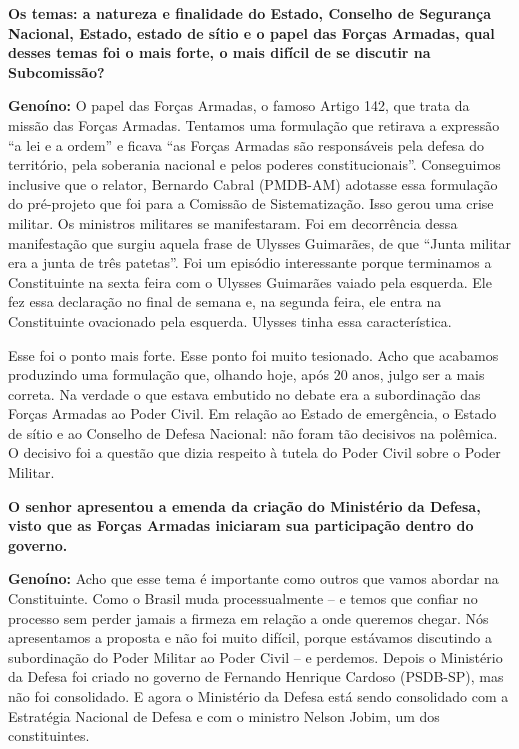 \textbf{Os temas: a natureza e finalidade do Estado, Conselho de
Segurança Nacional, Estado, estado de sítio e o papel das Forças
Armadas, qual desses temas foi o mais forte, o mais difícil de se
discutir na Subcomissão?}

\textbf{Genoíno:} O papel das Forças Armadas, o famoso Artigo 142, que
trata da missão das Forças Armadas. Tentamos uma formulação que retirava
a expressão ``a lei e a ordem'' e ficava ``as Forças Armadas são
responsáveis pela defesa do território, pela soberania nacional e pelos
poderes constitucionais''. Conseguimos inclusive que o relator, Bernardo
Cabral (PMDB-AM) adotasse essa formulação do pré-projeto que foi para a
Comissão de Sistematização. Isso gerou uma crise militar. Os ministros
militares se manifestaram. Foi em decorrência dessa manifestação que
surgiu aquela frase de Ulysses Guimarães, de que ``Junta militar era a
junta de três patetas''. Foi um episódio interessante porque terminamos
a Constituinte na sexta feira com o Ulysses Guimarães vaiado pela
esquerda. Ele fez essa declaração no final de semana e, na segunda
feira, ele entra na Constituinte ovacionado pela esquerda. Ulysses tinha
essa característica.

Esse foi o ponto mais forte. Esse ponto foi muito tesionado. Acho que
acabamos produzindo uma formulação que, olhando hoje, após 20 anos,
julgo ser a mais correta. Na verdade o que estava embutido no debate era
a subordinação das Forças Armadas ao Poder Civil. Em relação ao Estado
de emergência, o Estado de sítio e ao Conselho de Defesa Nacional: não
foram tão decisivos na polêmica. O decisivo foi a questão que dizia
respeito à tutela do Poder Civil sobre o Poder Militar.

\textbf{O senhor apresentou a emenda da criação do Ministério da Defesa,
visto que as Forças Armadas iniciaram sua participação dentro do
governo.}

\textbf{Genoíno:} Acho que esse tema é importante como outros que vamos
abordar na Constituinte. Como o Brasil muda processualmente -- e temos
que confiar no processo sem perder jamais a firmeza em relação a onde
queremos chegar. Nós apresentamos a proposta e não foi muito difícil,
porque estávamos discutindo a subordinação do Poder Militar ao Poder
Civil -- e perdemos. Depois o Ministério da Defesa foi criado no governo
de Fernando Henrique Cardoso (PSDB-SP), mas não foi consolidado. E agora
o Ministério da Defesa está sendo consolidado com a Estratégia Nacional
de Defesa e com o ministro Nelson Jobim, um dos constituintes.

